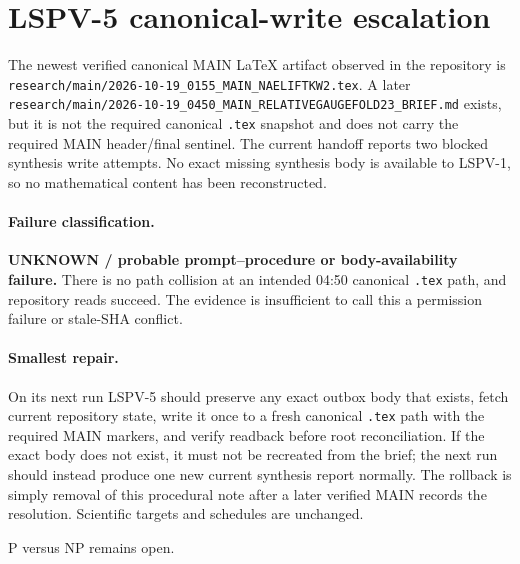 \documentclass[11pt]{article}
\begin{document}
\section*{LSPV-5 canonical-write escalation}
The newest verified canonical MAIN LaTeX artifact observed in the repository is
\texttt{research/main/2026-10-19\_0155\_MAIN\_NAELIFTKW2.tex}.  A later
\texttt{research/main/2026-10-19\_0450\_MAIN\_RELATIVEGAUGEFOLD23\_BRIEF.md}
exists, but it is not the required canonical \texttt{.tex} snapshot and does not
carry the required MAIN header/final sentinel.  The current handoff reports two
blocked synthesis write attempts.  No exact missing synthesis body is available
to LSPV-1, so no mathematical content has been reconstructed.

\paragraph{Failure classification.}
\textbf{UNKNOWN / probable prompt--procedure or body-availability failure.}
There is no path collision at an intended 04:50 canonical \texttt{.tex} path,
and repository reads succeed.  The evidence is insufficient to call this a
permission failure or stale-SHA conflict.

\paragraph{Smallest repair.}
On its next run LSPV-5 should preserve any exact outbox body that exists, fetch
current repository state, write it once to a fresh canonical \texttt{.tex} path
with the required MAIN markers, and verify readback before root reconciliation.
If the exact body does not exist, it must not be recreated from the brief; the
next run should instead produce one new current synthesis report normally.  The
rollback is simply removal of this procedural note after a later verified MAIN
records the resolution.  Scientific targets and schedules are unchanged.

P versus NP remains open.
\end{document}
